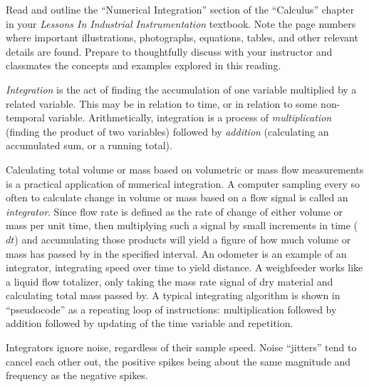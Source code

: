 

Read and outline the ``Numerical Integration'' section of the ``Calculus'' chapter in your {\it Lessons In Industrial Instrumentation} textbook.  Note the page numbers where important illustrations, photographs, equations, tables, and other relevant details are found.  Prepare to thoughtfully discuss with your instructor and classmates the concepts and examples explored in this reading.














{\it Integration} is the act of finding the accumulation of one variable multiplied by a related variable.  This may be in relation to time, or in relation to some non-temporal variable.  Arithmetically, integration is a process of {\it multiplication} (finding the product of two variables) followed by {\it addition} (calculating an accumulated sum, or a running total).

\vskip 10pt

Calculating total volume or mass based on volumetric or mass flow measurements is a practical application of numerical integration.  A computer sampling every so often to calculate change in volume or mass based on a flow signal is called an {\it integrator}.  Since flow rate is defined as the rate of change of either volume or mass per unit time, then multiplying such a signal by small increments in time ($dt$) and accumulating those products will yield a figure of how much volume or mass has passed by in the specified interval.  An odometer is an example of an integrator, integrating speed over time to yield distance.  A weighfeeder works like a liquid flow totalizer, only taking the mass rate signal of dry material and calculating total mass passed by.  A typical integrating algorithm is shown in ``pseudocode'' as a repeating loop of instructions: multiplication followed by addition followed by updating of the time variable and repetition.

Integrators ignore noise, regardless of their sample speed.  Noise ``jitters'' tend to cancel each other out, the positive spikes being about the same magnitude and frequency as the negative spikes.

